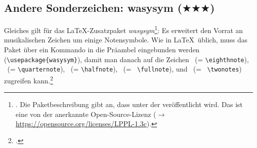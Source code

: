 %
%
%



\subsection{Andere Sonderzeichen: wasysym ($\bigstar\bigstar\bigstar$)}

Gleiches gilt für das \LaTeX-Zusatzpaket
\textit{wasysym}\footnote{\cite[vgl.][\nopage wp]{CtanWasysym2018a}.
Die Paketbeschreibung gibt an, dass  unter der  veröffentlicht wird. Das ist eine von der  anerkannte
Open-Source-Lizenz ($\rightarrow$
\href{https://opensource.org/licenses/LPPL-1.3c}
{https://opensource.org/licenses/LPPL-1.3c}).}: Es erweitert den Vorrat an
musikalischen Zeichen um einige Notensymbole. Wie in \LaTeX\ üblich, muss das
Paket über ein Kommando in
die Präambel eingebunden werden
(\texttt{\textbackslash{usepackage\{wasysym\}}}), damit man danach auf die
Zeichen \eighthnote \ (= \texttt{\small \textbackslash{eighthnote}}),
\quarternote \ (= \texttt{\small \textbackslash{quarternote}}), \halfnote \ (=
\texttt{\small \textbackslash{halfnote}}), \fullnote \ (= \texttt{\small
\textbackslash{fullnote}}), und \twonotes \ (= \texttt{\small
\textbackslash{twonotes}}) zugreifen kann.\footcite[vgl.][2]{Kielhorn2003a}

